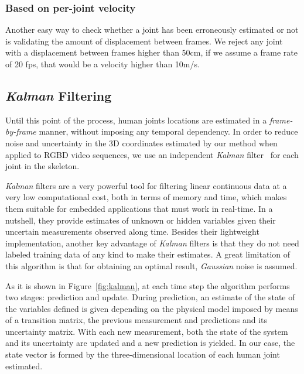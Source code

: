 \subsubsection{Based on per-joint velocity}
Another easy way to check whether a joint has been erroneously estimated or not is validating the amount of displacement between frames. We reject any joint with a displacement between frames higher than 50cm, \eg if we assume a frame rate of 20 \gls{fps}, that would be a velocity higher than 10m/s.

\subsection{\emph{Kalman} Filtering}\label{subsec:kalman_filtering}
Until this point of the process, human joints locations are estimated in a \emph{frame-by-frame} manner, without imposing any temporal dependency. In order to reduce noise and uncertainty in the 3D coordinates estimated by our method when applied to RGBD video sequences, we use an independent \emph{Kalman} filter~\cite{kalman1960new} for each joint in the skeleton.

\emph{Kalman} filters are a very powerful tool for filtering linear continuous data at a very low computational cost, both in terms of memory and time, which makes them suitable for embedded applications that must work in real-time. In a nutshell, they provide estimates of unknown or hidden variables given their uncertain measurements observed along time. Besides their lightweight implementation, another key advantage of \textit{Kalman} filters is that they do not need labeled training data of any kind to make their estimates. A great limitation of this algorithm is that for obtaining an optimal result, \textit{Gaussian} noise is assumed.

As it is shown in Figure~\ref{fig:kalman}, at each time step the algorithm performs two stages: prediction and update. During prediction, an estimate of the state of the variables defined is given depending on the physical model imposed by means of a transition matrix, the previous measurement and predictions and its uncertainty matrix. With each new measurement, both the state of the system and its uncertainty are updated and a new prediction is yielded. In our case, the state vector is formed by the three-dimensional location of each human joint estimated.

